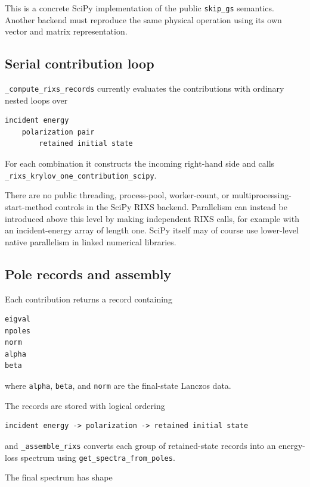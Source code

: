 \documentclass[11pt]{article}
\begin{document}
This is a concrete SciPy implementation of the public \texttt{skip\_gs} semantics.  Another backend must reproduce the same physical operation using its own vector and matrix representation.

\subsection{Serial contribution loop}

\texttt{\_compute\_rixs\_records} currently evaluates the contributions with ordinary nested loops over

\begin{lstlisting}
incident energy
    polarization pair
        retained initial state
\end{lstlisting}

For each combination it constructs the incoming right-hand side and calls \texttt{\_rixs\_krylov\_one\_contribution\_scipy}.

There are no public threading, process-pool, worker-count, or multiprocessing-start-method controls in the SciPy RIXS backend.  Parallelism can instead be introduced above this level by making independent RIXS calls, for example with an incident-energy array of length one.  SciPy itself may of course use lower-level native parallelism in linked numerical libraries.

\subsection{Pole records and assembly}

Each contribution returns a record containing

\begin{lstlisting}
eigval
npoles
norm
alpha
beta
\end{lstlisting}

where \texttt{alpha}, \texttt{beta}, and \texttt{norm} are the final-state Lanczos data.

The records are stored with logical ordering

\begin{lstlisting}
incident energy -> polarization -> retained initial state
\end{lstlisting}

and \texttt{\_assemble\_rixs} converts each group of retained-state records into an energy-loss spectrum using \texttt{get\_spectra\_from\_poles}.

The final spectrum has shape
\end{document}
